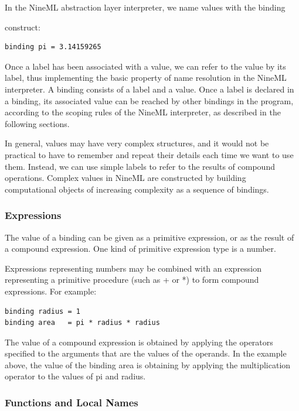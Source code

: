 \documentclass[a4paper]{article}
\begin{document}
In the NineML abstraction layer interpreter, we name values with the binding

construct:
\begin{lstlisting}[style=display]
binding pi = 3.14159265
\end{lstlisting}

Once a label has been associated with a value, we can refer to the
value by its label, thus implementing the basic property of name
resolution in the NineML interpreter. A binding consists of a label
and a value. Once a label is declared in a binding, its associated
value can be reached by other bindings in the program, according to
the scoping rules of the NineML interpreter, as described in the
following sections.

In general, values may have very complex structures, and it would not
be practical to have to remember and repeat their details each time we
want to use them. Instead, we can use simple labels to refer to the
results of compound operations. Complex values in NineML are
constructed by building computational objects of increasing complexity
as a sequence of bindings.

 
\subsubsection{Expressions}

The value of a binding can be given as a primitive expression, or as
the result of a compound expression. One kind of primitive expression
type is a number.

Expressions representing numbers may be combined with an expression
representing a primitive procedure (such as + or *) to form compound
expressions. For example:

\begin{lstlisting}[style=display]
binding radius = 1
binding area   = pi * radius * radius
\end{lstlisting}

The value of a compound expression is obtained by applying the
operators specified to the arguments that are the values of the
operands. In the example above, the value of the binding area is
obtaining by applying the multiplication operator to the values of pi
and radius.

\subsubsection{Functions and Local Names}
\end{document}
